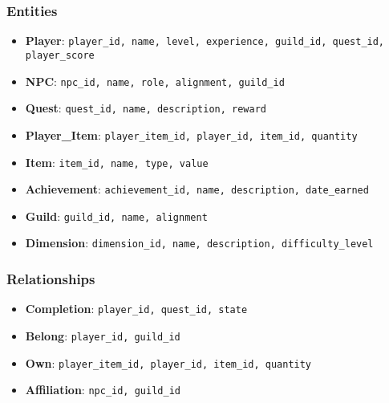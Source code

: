 \documentclass{article}
\begin{document}
\subsubsection{Entities}
\begin{itemize}
    \item \textbf{Player}: \texttt{player\_id, name, level, experience, guild\_id, quest\_id, player\_score}
    \item \textbf{NPC}: \texttt{npc\_id, name, role, alignment, guild\_id}
    \item \textbf{Quest}: \texttt{quest\_id, name, description, reward}
    \item \textbf{Player\_Item}: \texttt{player\_item\_id, player\_id, item\_id, quantity}
    \item \textbf{Item}: \texttt{item\_id, name, type, value}
    \item \textbf{Achievement}: \texttt{achievement\_id, name, description, date\_earned}
    \item \textbf{Guild}: \texttt{guild\_id, name, alignment}
    \item \textbf{Dimension}: \texttt{dimension\_id, name, description, difficulty\_level}
\end{itemize}

\subsubsection{Relationships}
\begin{itemize}
    \item \textbf{Completion}: \texttt{player\_id, quest\_id, state}
    \item \textbf{Belong}: \texttt{player\_id, guild\_id}
    \item \textbf{Own}: \texttt{player\_item\_id, player\_id, item\_id, quantity}
    \item \textbf{Affiliation}: \texttt{npc\_id, guild\_id}
\end{itemize}
\end{document}
